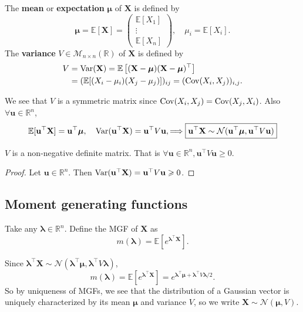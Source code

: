 \begin{definition}
    The \textbf{mean} or \textbf{expectation} $ \boldsymbol{\mu} $ of $\mathbf{X}$ is defined by 
    \[
        \boldsymbol{\mu} = \mathbb{E}[\mathbf{X}] = \begin{pmatrix}
            \mathbb{E}[X_1] \\ \vdots \\ \mathbb{E}[X_n]
        \end{pmatrix},\quad \mu_i = \mathbb{E}[X_i].
    \]
    The \textbf{variance} $ V\in \mathcal{M}_{n \times n}(\mathbb{R}) $ of $ \mathbf{X} $ is defined by 
    \begin{align*}
        V &= \operatorname{Var}(\mathbf{X})= \mathbb{E}\left[ (\mathbf{X}-\boldsymbol{\mu})(\mathbf{X}-\boldsymbol{\mu})^\top \right] \\ 
        &= (\mathbb{E}[(X_i-\mu_i)(X_j-\mu_j)])_{ij} = (\operatorname{Cov}(X_i,X_j))_{i,j}.
    \end{align*}
\end{definition}
We see that $V$ is a symmetric matrix since $ \operatorname{Cov}(X_i,X_j)=\operatorname{Cov}(X_j,X_i) $. Also $ \forall \mathbf{u}\in \mathbb{R}^{n} $,
\[
    \mathbb{E}[\mathbf{u}^\top\mathbf{X}] = \mathbf{u}^\top \boldsymbol{\mu},\quad \operatorname{Var}(\mathbf{u}^\top \mathbf{X}) = \mathbf{u}^\top V \mathbf{u}, \Longrightarrow \boxed{\mathbf{u}^\top \mathbf{X}\sim\mathcal N(\mathbf{u}^\top \boldsymbol{\mu},\mathbf{u}^\top V\mathbf{u})}
\]
\begin{proposition}
    $V$ is a non-negative definite matrix. That is $ \forall \mathbf{u}\in \mathbb{R}^{n}, \mathbf{u}^\top V\mathbf{u}\ge 0 $.
\end{proposition}
\begin{proof}
    Let $\mathbf{u}\in \mathbb{R}^{n}$. Then $ \operatorname{Var}(\mathbf{u}^\top \mathbf{X})=\mathbf{u}^\top V\mathbf{u}\geqslant 0 $.
\end{proof}
\subsection{Moment generating functions}
\begin{definition}
    Take any $ \boldsymbol{\lambda}\in \mathbb{R}^{n} $. Define the MGF of $\mathbf{X}$ as
    \[
        m(\boldsymbol{\lambda}) = \mathbb{E}[ e^{\boldsymbol{\lambda}^\top \mathbf{X}} ].
    \]
\end{definition}

Since $ \boldsymbol{\lambda}^\top \mathbf{X} \sim \mathcal{N}(\boldsymbol{\lambda}^\top \boldsymbol{\mu}, \boldsymbol{\lambda}^\top V \boldsymbol{\lambda}) $,
\[
    m(\boldsymbol{\lambda}) = \mathbb{E}[ e^{\boldsymbol{\lambda}^\top \mathbf{X}} ]= e^{\boldsymbol{\lambda}^\top \boldsymbol{\mu}+ \boldsymbol{\lambda}^\top V \boldsymbol{\lambda}/2}.
\]
So by uniqueness of MGFs, we see that the distribution of a Gaussian vector is uniquely characterized by its mean $\boldsymbol{\mu}$ and variance $V$, so we write $\mathbf{X}\sim\mathcal N(\boldsymbol{\mu},V)$.

